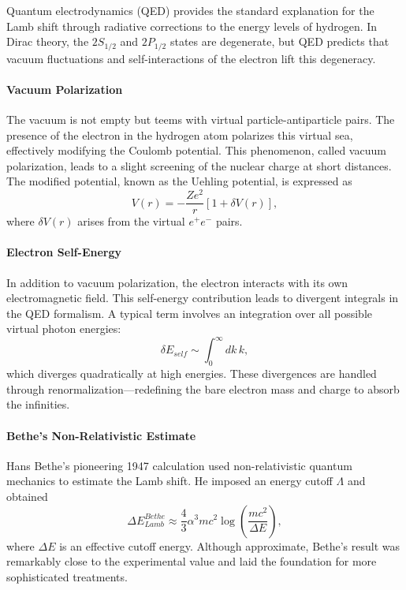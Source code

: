 \documentclass[12pt]{article}
\begin{document}
Quantum electrodynamics (QED) provides the standard explanation for the Lamb shift through radiative corrections to the energy levels of hydrogen. In Dirac theory, the \(2S_{1/2}\) and \(2P_{1/2}\) states are degenerate, but QED predicts that vacuum fluctuations and self-interactions of the electron lift this degeneracy.

\paragraph{Vacuum Polarization}
The vacuum is not empty but teems with virtual particle-antiparticle pairs. The presence of the electron in the hydrogen atom polarizes this virtual sea, effectively modifying the Coulomb potential. This phenomenon, called vacuum polarization, leads to a slight screening of the nuclear charge at short distances. The modified potential, known as the Uehling potential, is expressed as
\[
V(r) = -\frac{Ze^2}{r}\left[1+\delta V(r)\right],
\]
where \(\delta V(r)\) arises from the virtual \(e^+e^-\) pairs.

\paragraph{Electron Self-Energy}
In addition to vacuum polarization, the electron interacts with its own electromagnetic field. This self-energy contribution leads to divergent integrals in the QED formalism. A typical term involves an integration over all possible virtual photon energies:
\[
\delta E_{self} \sim \int_0^\infty dk\,k,
\]
which diverges quadratically at high energies. These divergences are handled through renormalization—redefining the bare electron mass and charge to absorb the infinities.

\paragraph{Bethe’s Non-Relativistic Estimate}
Hans Bethe’s pioneering 1947 calculation used non-relativistic quantum mechanics to estimate the Lamb shift. He imposed an energy cutoff \(\Lambda\) and obtained
\[
\Delta E_{Lamb}^{Bethe} \approx \frac{4}{3}\alpha^3 m c^2 \log\left(\frac{m c^2}{\Delta E}\right),
\]
where \(\Delta E\) is an effective cutoff energy. Although approximate, Bethe’s result was remarkably close to the experimental value and laid the foundation for more sophisticated treatments.
\end{document}
